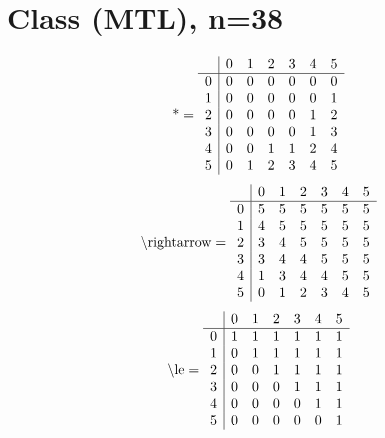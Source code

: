 \documentclass[11pt]{article}
\begin{document}
\section{Class (MTL), n=38}
\[\text{*} = 
\begin{array}{r | r r r r r r}
 & 0 & 1 & 2 & 3 & 4 & 5 \\ \hline
0 & 0 & 0 & 0 & 0 & 0 & 0 \\
1 & 0 & 0 & 0 & 0 & 0 & 1 \\
2 & 0 & 0 & 0 & 0 & 1 & 2 \\
3 & 0 & 0 & 0 & 0 & 1 & 3 \\
4 & 0 & 0 & 1 & 1 & 2 & 4 \\
5 & 0 & 1 & 2 & 3 & 4 & 5 \\
\end{array}
\]
\[\text{\textbackslash rightarrow} = 
\begin{array}{r | r r r r r r}
 & 0 & 1 & 2 & 3 & 4 & 5 \\ \hline
0 & 5 & 5 & 5 & 5 & 5 & 5 \\
1 & 4 & 5 & 5 & 5 & 5 & 5 \\
2 & 3 & 4 & 5 & 5 & 5 & 5 \\
3 & 3 & 4 & 4 & 5 & 5 & 5 \\
4 & 1 & 3 & 4 & 4 & 5 & 5 \\
5 & 0 & 1 & 2 & 3 & 4 & 5 \\
\end{array}
\]
\[\text{\textbackslash le} = 
\begin{array}{r | r r r r r r}
 & 0 & 1 & 2 & 3 & 4 & 5 \\ \hline
0 & 1 & 1 & 1 & 1 & 1 & 1 \\
1 & 0 & 1 & 1 & 1 & 1 & 1 \\
2 & 0 & 0 & 1 & 1 & 1 & 1 \\
3 & 0 & 0 & 0 & 1 & 1 & 1 \\
4 & 0 & 0 & 0 & 0 & 1 & 1 \\
5 & 0 & 0 & 0 & 0 & 0 & 1 \\
\end{array}
\]
\end{document}
